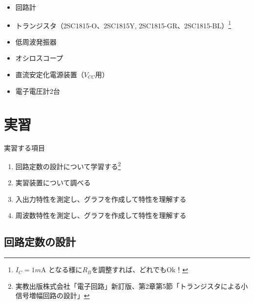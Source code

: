 \documentclass[uplatex,a4paper,11pt,oneside,openany]{jsbook}
\begin{document}
\begin{itemize}
\item 回路計
\item トランジスタ（2SC1815-O、2SC1815Y, 2SC1815-GR、2SC1815-BL）\footnote{$I_C=1m$A となる様に$R_B$を調整すれば、どれでもOk！}
\item 低周波発振器
\item オシロスコープ
\item 直流安定化電源装置（$V_{CC}$用）
\item 電子電圧計2台
\end{itemize}

\section{実習}

実習する項目
\begin{enumerate}
\item[(1)] 回路定数の設計について学習する\footnote{実教出版株式会社「電子回路」新訂版、第2章第5節「トランジスタによる小信号増幅回路の設計」}
\item[(2)] 実習装置について調べる
\item[(3)] 入出力特性を測定し、グラフを作成して特性を理解する
\item[(4)] 周波数特性を測定し、グラフを作成して特性を理解する
\end{enumerate}

\newpage

\subsection{回路定数の設計}
\end{document}
